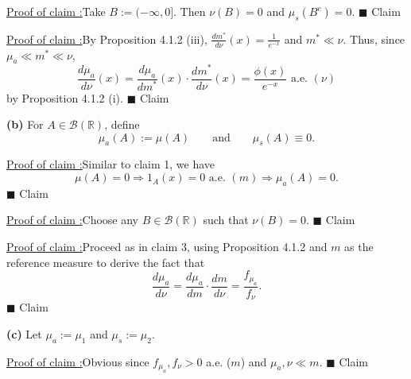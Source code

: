 \documentclass[12pt]{article}
\newcounter{ProofCounter}
\newcounter{ClaimCounter}[ProofCounter]
\newenvironment{claim}[1]{\stepcounter{ClaimCounter}\par\noindent\underline{Claim \theClaimCounter:}\space#1}{}
\newenvironment{claimproof}[1]{\par\noindent\underline{Proof of claim \theClaimCounter:}\space#1}{\hfill $\blacksquare$ Claim \theClaimCounter\vspace{5mm}}
\begin{document}
\begin{claimproof}
Take $B := (-\infty, 0]$. Then $\nu(B) = 0$ and $\mu_{s}(B^{c}) = 0$. 
\end{claimproof}

\begin{claimproof}
By Proposition 4.1.2 (iii), $\frac{dm^{*}}{d\nu}(x) = \frac{1}{e^{-x}}$ and $m^{*} \ll \nu$. Thus, since $\mu_{a} \ll m^* \ll \nu$,
\[ \frac{d\mu_{a}}{d\nu}(x) = \frac{d\mu_{a}}{dm^{*}}(x) \cdot \frac{dm^*}{d\nu}(x) = \frac{\phi(x) }{e^{-x}} \text{ a.e. }(\nu) \]
by Proposition 4.1.2 (i).
\end{claimproof}



{\bf (b)} 
For $A \in \mathcal{B}(\mathbb{R})$, define 
\[ \mu_{a}(A) := \mu(A) \qquad \text{and}\qquad \mu_{s}(A) \equiv 0. \]
\begin{claimproof}
Similar to claim 1, we have 
\[ \mu(A) = 0 \Rightarrow 1_{A}(x) = 0\text{ a.e. }(m) \Rightarrow \mu_{a}(A) = 0. \]
\end{claimproof}

\begin{claimproof}
Choose any $B \in \mathcal{B}(\mathbb{R})$ such that $\nu(B) = 0$.
\end{claimproof}

\begin{claimproof}
Proceed as in claim 3, using Proposition 4.1.2 and $m$ as the reference measure to derive the fact that 
\[ \frac{d\mu_{a}}{d\nu} = \frac{d\mu_{a}}{dm} \cdot \frac{dm}{d\nu} = \frac{f_{\mu_{a}}}{f_{\nu}}. \]
\end{claimproof}



{\bf (c)}
Let $\mu_{a} := \mu_{1}$ and $\mu_{s} := \mu_{2}$.

\begin{claimproof}
Obvious since $f_{\mu_{a}}, f_{\nu} > 0$ a.e. ($m$) and $\mu_{a}, \nu \ll m$.
\end{claimproof}
\end{document}
